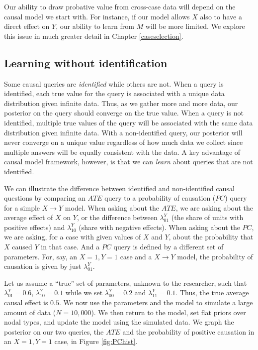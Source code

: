 \documentclass[
  12pt,
]{book}
\begin{document}
Our ability to draw probative value from cross-case data will depend on the causal model we start with. For instance, if our model allows \(X\) also to have a direct effect on \(Y\), our ability to learn from \(M\) will be more limited. We explore this issue in much greater detail in Chapter \ref{caseselection}.

\hypertarget{learning-without-identification}{%
\subsection{Learning without identification}\label{learning-without-identification}}

Some causal queries are \emph{identified} while others are not. When a query is identified, each true value for the query is associated with a unique data distribution given infinite data. Thus, as we gather more and more data, our posterior on the query should converge on the true value. When a query is not identified, multiple true values of the query will be associated with the same data distribution given infinite data. With a non-identified query, our posterior will never converge on a unique value regardless of how much data we collect since multiple answers will be equally consistent with the data. A key advantage of causal model framework, however, is that we can \emph{learn} about queries that are not identified.

We can illustrate the difference between identified and non-identified causal questions by comparing an \(ATE\) query to a probability of causation (\(PC\)) query for a simple \(X \rightarrow Y\) model. When asking about the \(ATE\), we are asking about the average effect of \(X\) on \(Y\), or the difference between \(\lambda^Y_{01}\) (the share of units with positive effects) and \(\lambda^Y_{10}\) (share with negative effects). When asking about the \(PC\), we are asking, for a case with given values of \(X\) and \(Y\), about the probability that \(X\) caused \(Y\) in that case. And a \(PC\) query is defined by a different set of parameters. For, say, an \(X=1, Y=1\) case and a \(X \rightarrow Y\) model, the probability of causation is given by just \(\lambda^Y_{01}\).

Let us assume a ``true'' set of parameters, unknown to the researcher, such that \(\lambda^Y_{01} = 0.6\), \(\lambda^Y_{10} = 0.1\) while we set \(\lambda^Y_{00} = 0.2\) and \(\lambda^Y_{11} = 0.1\). Thus, the true average causal effect is \(0.5\). We now use the parameters and the model to simulate a large amount of data (\(N=10,000\)). We then return to the model, set flat priors over nodal types, and update the model using the simulated data. We graph the posterior on our two queries, the \(ATE\) and the probability of positive causation in an \(X=1, Y=1\) case, in Figure \ref{fig:PChist}.
\end{document}
